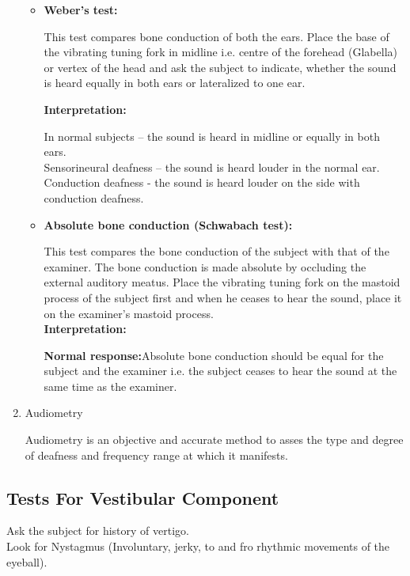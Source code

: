 \documentclass[a4paper,12pt,openany,oneside]{book}
\begin{document}
\begin{enumerate}
\begin{itemize}
{						}

					\item{\textbf{Weber’s test:}
\par
This test compares bone conduction of both the ears. 
Place the base of the vibrating tuning fork in midline i.e. centre of the forehead (Glabella) or vertex of the head and ask the subject to indicate, whether the sound is heard equally in both ears or lateralized to one ear.

						\textbf{Interpretation:}
						\par
In normal subjects – the sound is heard in midline or equally in both ears.\\
Sensorineural deafness – the sound is heard louder in the normal ear.\\
Conduction deafness - the sound is heard louder on the side with conduction deafness.
}
\item{\textbf{Absolute bone conduction (Schwabach test):}
	\par
	This test compares the bone conduction of the subject with that of the examiner.
	The bone conduction is made absolute by occluding the external auditory meatus. Place the vibrating tuning fork on the mastoid process of the subject first and when he ceases to hear the sound, place it on the examiner’s mastoid process.\\
						\textbf{Interpretation:}
						\par
						\textbf{Normal response:}Absolute bone conduction should be equal for the subject and the examiner i.e. the subject ceases to hear the sound at the same time as the examiner.
						}
				\end{itemize}

\item{Audiometry
	\par
	Audiometry is an objective and accurate method to asses the type and degree of deafness and frequency range at which it manifests.
	}

		\end{enumerate}

\subsection*{Tests For Vestibular Component}
Ask the subject for history of vertigo.\\
Look for Nystagmus (Involuntary, jerky, to and fro rhythmic movements of the eyeball).
\end{document}
